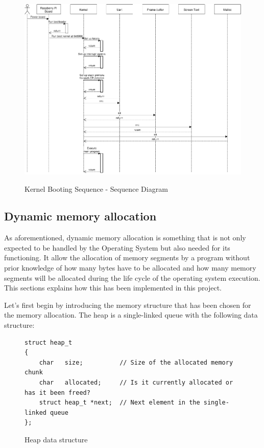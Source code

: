\begin{figure}[H]
\begin{center}
\includegraphics[width=1\textwidth]{includes/figures/chapter5_kernel_booting_sequence.png}  \\
\caption{Kernel Booting Sequence - Sequence Diagram}
\end{center}
\label{fig:chapter5_kernel_booting_sequence}
\end{figure}





\subsection{Dynamic memory allocation}
As aforementioned, dynamic memory allocation is something that is not only expected to be handled by the Operating System but also needed for its functioning. It allow the allocation of memory segments by a program without prior knowledge of how many bytes have to be allocated and how many memory segments will be allocated during the life cycle of the operating system execution. This sections explains how this has been implemented in this project.

Let's first begin by introducing the memory structure that has been chosen for the memory allocation. The heap is a single-linked queue with the following data structure:

\lstset{language=C}
\begin{figure}[H]
\begin{minipage}{\linewidth}
\begin{lstlisting}[frame=single]
struct heap_t
{
    char   size;          // Size of the allocated memory chunk
    char   allocated;     // Is it currently allocated or has it been freed?
    struct heap_t *next;  // Next element in the single-linked queue
};
\end{lstlisting}
\end{minipage}
\caption{Heap data structure}
\end{figure}

